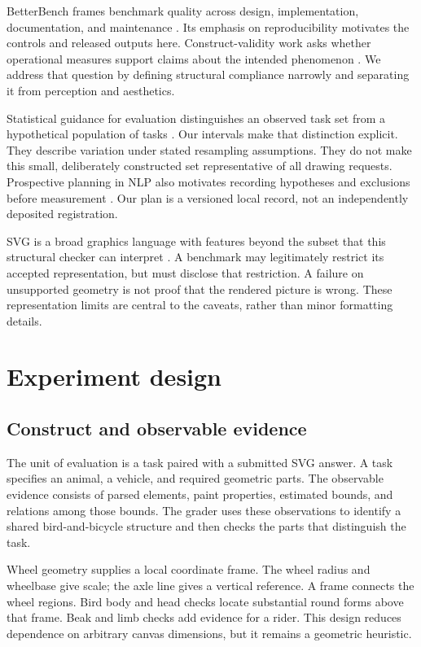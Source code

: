 \documentclass{article}
\begin{document}
BetterBench frames benchmark quality across design, implementation, documentation, and maintenance \citep{reuel}. Its emphasis on reproducibility motivates the controls and released outputs here. Construct-validity work asks whether operational measures support claims about the intended phenomenon \citep{bean}. We address that question by defining structural compliance narrowly and separating it from perception and aesthetics.

Statistical guidance for evaluation distinguishes an observed task set from a hypothetical population of tasks \citep{miller}. Our intervals make that distinction explicit. They describe variation under stated resampling assumptions. They do not make this small, deliberately constructed set representative of all drawing requests. Prospective planning in NLP also motivates recording hypotheses and exclusions before measurement \citep{prereg}. Our plan is a versioned local record, not an independently deposited registration.

SVG is a broad graphics language with features beyond the subset that this structural checker can interpret \citep{svg}. A benchmark may legitimately restrict its accepted representation, but must disclose that restriction. A failure on unsupported geometry is not proof that the rendered picture is wrong. These representation limits are central to the caveats, rather than minor formatting details.

\section{Experiment design}
\subsection{Construct and observable evidence}
The unit of evaluation is a task paired with a submitted SVG answer. A task specifies an animal, a vehicle, and required geometric parts. The observable evidence consists of parsed elements, paint properties, estimated bounds, and relations among those bounds. The grader uses these observations to identify a shared bird-and-bicycle structure and then checks the parts that distinguish the task.

Wheel geometry supplies a local coordinate frame. The wheel radius and wheelbase give scale; the axle line gives a vertical reference. A frame connects the wheel regions. Bird body and head checks locate substantial round forms above that frame. Beak and limb checks add evidence for a rider. This design reduces dependence on arbitrary canvas dimensions, but it remains a geometric heuristic.
\end{document}

